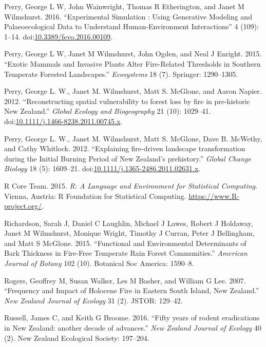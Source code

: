 \hypertarget{ref-Perry2016}{}
Perry, George L W, John Wainwright, Thomas R Etherington, and Janet M
Wilmshurst. 2016. ``Experimental Simulation : Using Generative Modeling
and Palaeoecological Data to Understand Human-Environment Interactions''
4 (109): 1--14.
doi:\href{https://doi.org/10.3389/fevo.2016.00109}{10.3389/fevo.2016.00109}.

\hypertarget{ref-perry2015exotic}{}
Perry, George L W, Janet M Wilmshurst, John Ogden, and Neal J Enright.
2015. ``Exotic Mammals and Invasive Plants Alter Fire-Related Thresholds
in Southern Temperate Forested Landscapes.'' \emph{Ecosystems} 18 (7).
Springer: 1290--1305.

\hypertarget{ref-Perry2012a}{}
Perry, George L. W., Janet M. Wilmshurst, Matt S. McGlone, and Aaron
Napier. 2012. ``Reconstructing spatial vulnerability to forest loss by
fire in pre-historic New Zealand.'' \emph{Global Ecology and
Biogeography} 21 (10): 1029--41.
doi:\href{https://doi.org/10.1111/j.1466-8238.2011.00745.x}{10.1111/j.1466-8238.2011.00745.x}.

\hypertarget{ref-Perry2012}{}
Perry, George L. W., Janet M. Wilmshurst, Matt S. McGlone, Dave B.
McWethy, and Cathy Whitlock. 2012. ``Explaining fire-driven landscape
transformation during the Initial Burning Period of New Zealand's
prehistory.'' \emph{Global Change Biology} 18 (5): 1609--21.
doi:\href{https://doi.org/10.1111/j.1365-2486.2011.02631.x}{10.1111/j.1365-2486.2011.02631.x}.

\hypertarget{ref-R-stat}{}
R Core Team. 2015. \emph{R: A Language and Environment for Statistical
Computing}. Vienna, Austria: R Foundation for Statistical Computing.
\url{https://www.R-project.org/}.

\hypertarget{ref-richardson2015functional}{}
Richardson, Sarah J, Daniel C Laughlin, Michael J Lawes, Robert J
Holdaway, Janet M Wilmshurst, Monique Wright, Timothy J Curran, Peter J
Bellingham, and Matt S McGlone. 2015. ``Functional and Environmental
Determinants of Bark Thickness in Fire-Free Temperate Rain Forest
Communities.'' \emph{American Journal of Botany} 102 (10). Botanical Soc
America: 1590--8.

\hypertarget{ref-rogers2007frequency}{}
Rogers, Geoffrey M, Susan Walker, Les M Basher, and William G Lee. 2007.
``Frequency and Impact of Holocene Fire in Eastern South Island, New
Zealand.'' \emph{New Zealand Journal of Ecology} 31 (2). JSTOR: 129--42.

\hypertarget{ref-russell2016fifty}{}
Russell, James C, and Keith G Broome. 2016. ``Fifty years of rodent
eradications in New Zealand: another decade of advances.'' \emph{New
Zealand Journal of Ecology} 40 (2). New Zealand Ecological Society:
197--204.

